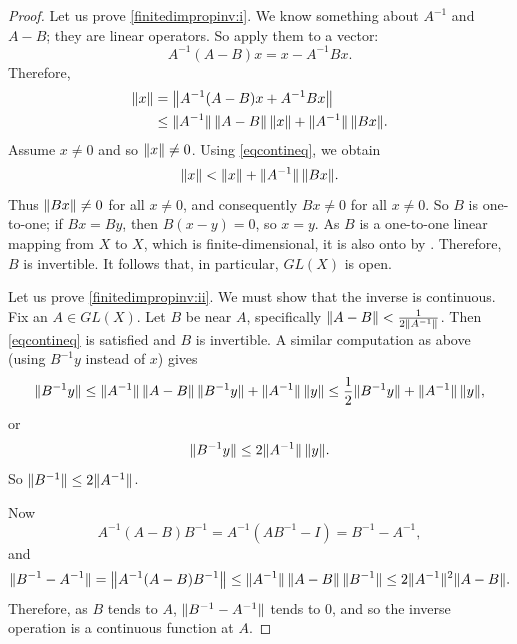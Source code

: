 \begin{proof}
Let us prove \ref{finitedimpropinv:i}.   We know something about $A^{-1}$
and $A-B$; they are linear operators.
So apply them to a vector:
\begin{equation*}
A^{-1}(A-B)x
=
x-A^{-1}Bx .
\end{equation*}
Therefore,
\begin{equation*}
\begin{split}
\lVert {x} \rVert 
& =
\bigl\lVert {A^{-1} (A-B)x + A^{-1}Bx} \bigr\rVert
\\
& \leq
\lVert {A^{-1}} \rVert\,\lVert {A-B} \rVert\, \lVert {x} \rVert + \lVert {A^{-1}} \rVert\,\lVert {Bx} \rVert .
\end{split}
\end{equation*}
Assume $x \neq 0$ and so $\lVert {x} \rVert \neq 0$.
Using \eqref{eqcontineq}, we obtain
\begin{equation*}
\lVert {x} \rVert < \lVert {x} \rVert + \lVert {A^{-1}} \rVert \, \lVert {Bx} \rVert .
\end{equation*}
Thus $\lVert {Bx} \rVert \neq 0$ for all $x \neq 0$, and consequently
$Bx \neq 0$ for all $x \neq 0$.  So
$B$ is one-to-one; if $Bx = By$, then $B(x-y) = 0$, so $x=y$.
As $B$ is a one-to-one linear mapping from $X$ to $X$, which is finite-dimensional,
it is also onto by .
Therefore, $B$ is invertible.
It follows that, in particular, $GL(X)$ is open.

Let us prove \ref{finitedimpropinv:ii}.
We must show that the inverse is continuous.
Fix an $A \in GL(X)$.  Let $B$ be near $A$,
specifically $\lVert {A-B} \rVert < \frac{1}{2 \lVert {A^{-1}} \rVert}$.
Then \eqref{eqcontineq} is satisfied and $B$ is invertible.
A similar computation as above (using $B^{-1}y$ instead of $x$) gives
\begin{equation*}
\lVert {B^{-1}y} \rVert \leq 
\lVert {A^{-1}} \rVert \, \lVert {A-B} \rVert \,  \lVert {B^{-1}y} \rVert + \lVert {A^{-1}} \rVert \, \lVert {y} \rVert
\leq
\frac{1}{2} \lVert {B^{-1}y} \rVert + \lVert {A^{-1}} \rVert\,\lVert {y} \rVert ,
\end{equation*}
or
\begin{equation*}
\lVert {B^{-1}y} \rVert \leq 
2\lVert {A^{-1}} \rVert\,\lVert {y} \rVert .
\end{equation*}
So
$
\lVert {B^{-1}} \rVert \leq 2 \lVert {A^{-1}} \rVert
$.

Now
\begin{equation*}
A^{-1}(A-B)B^{-1} = 
A^{-1}(AB^{-1}-I) = 
B^{-1}-A^{-1} ,
\end{equation*}
and
\begin{equation*}
\lVert {B^{-1}-A^{-1}} \rVert =
\bigl\lVert {A^{-1}(A-B)B^{-1}} \bigr\rVert \leq
\lVert {A^{-1}} \rVert\,\lVert {A-B} \rVert\,\lVert {B^{-1}} \rVert
\leq
2\lVert {A^{-1}} \rVert^2
\lVert {A-B} \rVert .
\end{equation*}
Therefore, as $B$ tends to $A$, $\lVert {B^{-1}-A^{-1}} \rVert$ tends to 0, and
so the inverse operation is a continuous function at $A$.
\end{proof}


